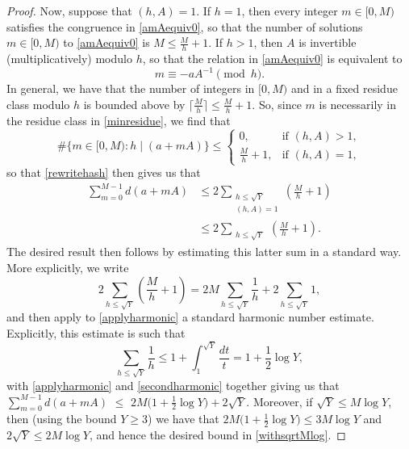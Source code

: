 \documentclass[12pt]{article}
\begin{document}
\begin{proof}
 Now, suppose that $(h, A) = 1$. If $h = 1$, then every integer $m \in [0, M)$ satisfies the congruence in \eqref{amAequiv0}, so that the 
 number of solutions $m \in [0, M)$ to \eqref{amAequiv0}
 is $M \leq \frac{M}{h} + 1$.
 If $h > 1$, then $A$ is invertible (multiplicatively) modulo $h$, 
 so that the relation in \eqref{amAequiv0} is equivalent to
\begin{equation}\label{minresidue} 
 m \equiv -aA^{-1} \pmod h. 
\end{equation}
 In general, we have that the number of integers in $ [0, M)$ and in a fixed residue class modulo $h$ is bounded above by $ \big\lceil 
 \frac{M}{h} \big\rceil \leq \frac{M}{h} + 1$. So, since $m$ is necessarily in the residue class in \eqref{minresidue}, 
 we find that $$ \#\{ m\in [0, M) : h \mid (a + m A) \} \leq \begin{cases} 
 0, & \text{if $(h, A) > 1$}, \\
 \frac{M}{h} + 1, & \text{if $(h, A) = 1$,} 
 \end{cases} $$
 so that \eqref{rewritehash} then gives us that 
\begin{align*}
 \sum_{m=0}^{M-1} d(a + m A) 
 & \leq 2 \sum_{\substack{ h \leq \sqrt{Y} \\ (h, A) = 1 }} 
 \left( \frac{M}{h} + 1 \right) \\ 
 & \leq 2 \sum_{\substack{ h \leq \sqrt{Y} }} 
 \left( \frac{M}{h} + 1 \right).
\end{align*}
 The desired result then follows by estimating this latter sum in a standard way. More explicitly, 
 we write
\begin{equation}\label{applyharmonic}
 2 \sum_{h \leq \sqrt{Y}} \left( \frac{M}{h} + 1 \right) 
 = 2 M \sum_{h \leq \sqrt{Y}} \frac{1}{h} + 2 \sum_{h \leq \sqrt{Y}} 1, 
\end{equation}
 and then apply to \eqref{applyharmonic} a standard harmonic number estimate. 
 Explicitly, this estimate is such that 
\begin{equation}\label{secondharmonic} 
 \sum_{h \leq \sqrt{Y}}\frac{1}{h} \leq 1 + \int_1^{\sqrt{Y}} \frac{dt}{t} = 1 + \frac{1}{2} \log Y,
\end{equation}
 with \eqref{applyharmonic} and \eqref{secondharmonic} together giving us that 
 $ \sum_{m=0}^{M-1} d(a + m A) $ $ \leq $ $ 2M \big( 1 + \frac{1}{2} \log Y \big) + 2 \sqrt{Y}$. 
 Moreover, if $\sqrt{Y} \leq M \log Y$, then (using the bound $Y \geq 3$) 
 we have that $2 M \big( 1 + \frac{1}{2} \log Y \big) \leq 3 M \log Y$ and $2 \sqrt{Y} \leq 2 M \log Y$, 
 and hence the desired bound in \eqref{withsqrtMlog}. 
\end{proof}
\end{document}
